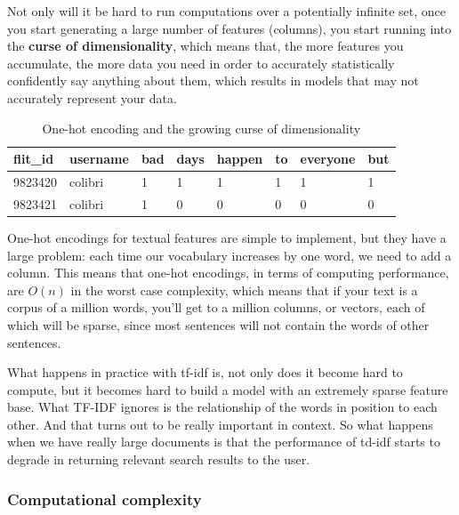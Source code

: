 \documentclass[draft, 11pt]{diazessay} %
\begin{document}
Not only will it be hard to run computations over a potentially infinite set, once you start generating a large number of features (columns), you start running into the \textbf{curse of dimensionality}, which means that, the more features you accumulate, the more data you need in order to accurately statistically confidently say anything about them, which results in models that may not accurately represent your data\citep{houle2010can}. 


\begin{table}[h!]
    \centering
    \caption{One-hot encoding and the growing curse of dimensionality}
\begin{tabular}{|l|l|l|l|l|l|l|l|}
\hline
\rowcolor[HTML]{EFEFEF} 
flit\_id & username & bad & days & happen & to & everyone & but \\ \hline
9823420  & colibri  & 1   & 1    & 1      & 1  & 1        & 1   \\ \hline
9823421  & colibri  & 1   & 0    & 0      & 0  & 0        & 0   \\ \hline
\end{tabular}
\end{table}

One-hot encodings for textual features are simple to implement, but they have a large problem: each time our vocabulary increases by one word, we need to add a column. This means that one-hot encodings, in terms of computing performance, are \begin{math}O(n)\end{math} in the worst case complexity, which means that if your text is a corpus of a million words, you'll get to a million columns, or vectors, each of which will be sparse, since most sentences will not contain the words of other sentences.   

What happens in practice with tf-idf is, not only does it become hard to compute, but it becomes hard to build a model with an extremely sparse feature base. What TF-IDF ignores is the relationship of the words in position to each other. And that turns out to be really important in context. So what happens when we have really large documents is that the performance of td-idf starts to degrade in returning relevant search results to the user. 
 
  \subsubsection{Computational complexity}
  
\end{document}
